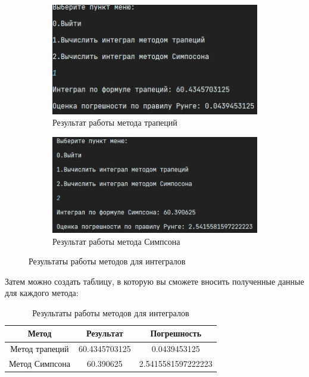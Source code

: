\documentclass[12pt]{article}
\begin{document}
\begin{figure}[ht]
\centering
\begin{subfigure}{0.4\textwidth}
\includegraphics[width=\linewidth]{trapezoid_rule.png}
\caption{Результат работы метода трапеций}
\end{subfigure}
\hfill
\begin{subfigure}{0.4\textwidth}
\includegraphics[width=\linewidth]{simpson_rule.png}
\caption{Результат работы метода Симпсона}
\end{subfigure}
\caption{Результаты работы методов для интегралов}
\end{figure}

Затем можно создать таблицу, в которую вы сможете вносить полученные данные для каждого метода:

\begin{table}[ht]
\centering
\begin{tabular}{|c|c|c|}
\hline
\textbf{Метод} & \textbf{Результат} & \textbf{Погрешность} \\
\hline
Метод трапеций & 60.4345703125 & 0.0439453125 \\
\hline
Метод Симпсона & 60.390625 &2.5415581597222223 \\
\hline
\end{tabular}
\caption{Результаты работы методов для интегралов}
\end{table}
\end{document}
